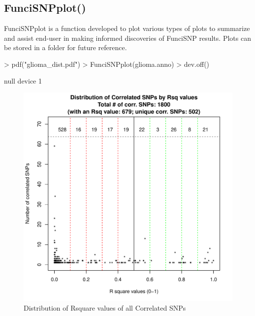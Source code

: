 \documentclass[a4paper]{article}
\begin{document}
\subsection*{FunciSNPplot()}
FunciSNPplot is a function developed to plot various types of plots to summarize
 and assist end-user in making informed discoveries of FunciSNP results. Plots 
 can be stored in a folder for future reference.
\begin{Schunk}
\begin{Sinput}
> pdf("glioma_dist.pdf")
> FunciSNPplot(glioma.anno)
> dev.off()
\end{Sinput}
\begin{Soutput}
null device 
          1 
\end{Soutput}
\end{Schunk}
\begin{figure}[ht!]
\begin{center}
\includegraphics{glioma_dist.pdf}
\caption{\label{fig:glioma_dist.pdf} Distribution of Rsquare values of all 
Correlated SNPs}
{\footnotesize{}}
\end{center}
\end{figure}
\end{document}
